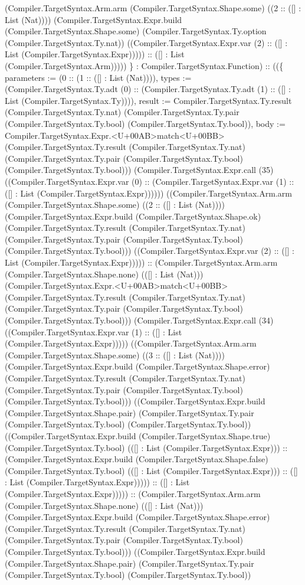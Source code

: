 \documentclass[11pt]{article}
\begin{document}
(Compiler.TargetSyntax.Arm.arm (Compiler.TargetSyntax.Shape.some) ((2 :: ([] : List (Nat)))) (Compiler.TargetSyntax.Expr.build (Compiler.TargetSyntax.Shape.some) (Compiler.TargetSyntax.Ty.option (Compiler.TargetSyntax.Ty.nat)) ((Compiler.TargetSyntax.Expr.var (2) :: ([] : List (Compiler.TargetSyntax.Expr))))) :: ([] : List (Compiler.TargetSyntax.Arm))))) \} : Compiler.TargetSyntax.Function) :: ((\{ parameters := (0 :: (1 :: ([] : List (Nat)))), types := (Compiler.TargetSyntax.Ty.adt (0) :: (Compiler.TargetSyntax.Ty.adt (1) :: ([] : List (Compiler.TargetSyntax.Ty)))), result := Compiler.TargetSyntax.Ty.result (Compiler.TargetSyntax.Ty.nat) (Compiler.TargetSyntax.Ty.pair (Compiler.TargetSyntax.Ty.bool) (Compiler.TargetSyntax.Ty.bool)), body := Compiler.TargetSyntax.Expr.<U+00AB>match<U+00BB> (Compiler.TargetSyntax.Ty.result (Compiler.TargetSyntax.Ty.nat) (Compiler.TargetSyntax.Ty.pair (Compiler.TargetSyntax.Ty.bool) (Compiler.TargetSyntax.Ty.bool))) (Compiler.TargetSyntax.Expr.call (35) ((Compiler.TargetSyntax.Expr.var (0) :: (Compiler.TargetSyntax.Expr.var (1) :: ([] : List (Compiler.TargetSyntax.Expr)))))) ((Compiler.TargetSyntax.Arm.arm (Compiler.TargetSyntax.Shape.some) ((2 :: ([] : List (Nat)))) (Compiler.TargetSyntax.Expr.build (Compiler.TargetSyntax.Shape.ok) (Compiler.TargetSyntax.Ty.result (Compiler.TargetSyntax.Ty.nat) (Compiler.TargetSyntax.Ty.pair (Compiler.TargetSyntax.Ty.bool) (Compiler.TargetSyntax.Ty.bool))) ((Compiler.TargetSyntax.Expr.var (2) :: ([] : List (Compiler.TargetSyntax.Expr))))) :: (Compiler.TargetSyntax.Arm.arm (Compiler.TargetSyntax.Shape.none) (([] : List (Nat))) (Compiler.TargetSyntax.Expr.<U+00AB>match<U+00BB> (Compiler.TargetSyntax.Ty.result (Compiler.TargetSyntax.Ty.nat) (Compiler.TargetSyntax.Ty.pair (Compiler.TargetSyntax.Ty.bool) (Compiler.TargetSyntax.Ty.bool))) (Compiler.TargetSyntax.Expr.call (34) ((Compiler.TargetSyntax.Expr.var (1) :: ([] : List (Compiler.TargetSyntax.Expr))))) ((Compiler.TargetSyntax.Arm.arm (Compiler.TargetSyntax.Shape.some) ((3 :: ([] : List (Nat)))) (Compiler.TargetSyntax.Expr.build (Compiler.TargetSyntax.Shape.error) (Compiler.TargetSyntax.Ty.result (Compiler.TargetSyntax.Ty.nat) (Compiler.TargetSyntax.Ty.pair (Compiler.TargetSyntax.Ty.bool) (Compiler.TargetSyntax.Ty.bool))) ((Compiler.TargetSyntax.Expr.build (Compiler.TargetSyntax.Shape.pair) (Compiler.TargetSyntax.Ty.pair (Compiler.TargetSyntax.Ty.bool) (Compiler.TargetSyntax.Ty.bool)) ((Compiler.TargetSyntax.Expr.build (Compiler.TargetSyntax.Shape.true) (Compiler.TargetSyntax.Ty.bool) (([] : List (Compiler.TargetSyntax.Expr))) :: (Compiler.TargetSyntax.Expr.build (Compiler.TargetSyntax.Shape.false) (Compiler.TargetSyntax.Ty.bool) (([] : List (Compiler.TargetSyntax.Expr))) :: ([] : List (Compiler.TargetSyntax.Expr))))) :: ([] : List (Compiler.TargetSyntax.Expr))))) :: (Compiler.TargetSyntax.Arm.arm (Compiler.TargetSyntax.Shape.none) (([] : List (Nat))) (Compiler.TargetSyntax.Expr.build (Compiler.TargetSyntax.Shape.error) (Compiler.TargetSyntax.Ty.result (Compiler.TargetSyntax.Ty.nat) (Compiler.TargetSyntax.Ty.pair (Compiler.TargetSyntax.Ty.bool) (Compiler.TargetSyntax.Ty.bool))) ((Compiler.TargetSyntax.Expr.build (Compiler.TargetSyntax.Shape.pair) (Compiler.TargetSyntax.Ty.pair (Compiler.TargetSyntax.Ty.bool) (Compiler.TargetSyntax.Ty.bool)) 
\end{document}
